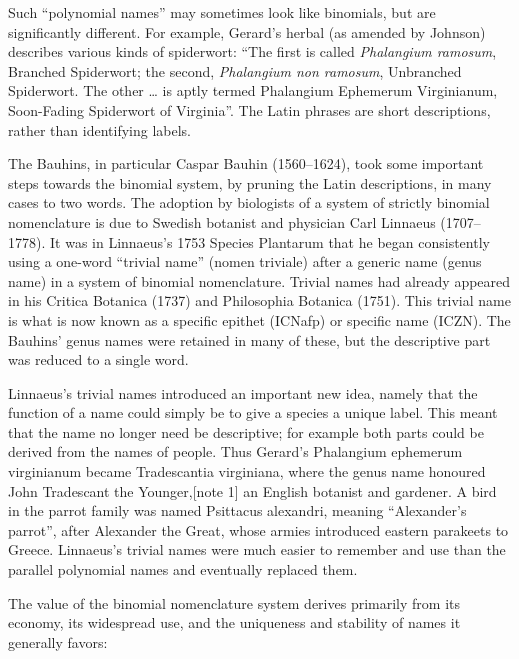 Such ``polynomial names'' may sometimes look like binomials, but are significantly different. For example, Gerard's herbal (as amended by Johnson) describes various kinds of spiderwort: ``The first is called \emph{Phalangium ramosum}, Branched Spiderwort; the second, \emph{Phalangium non ramosum}, Unbranched Spiderwort. The other \ldots{} is aptly termed Phalangium Ephemerum Virginianum, Soon-Fading Spiderwort of Virginia''. The Latin phrases are short descriptions, rather than identifying labels.

The Bauhins, in particular Caspar Bauhin (1560--1624), took some important steps towards the binomial system, by pruning the Latin descriptions, in many cases to two words. The adoption by biologists of a system of strictly binomial nomenclature is due to Swedish botanist and physician Carl Linnaeus (1707--1778). It was in Linnaeus's 1753 Species Plantarum that he began consistently using a one-word ``trivial name'' (nomen triviale) after a generic name (genus name) in a system of binomial nomenclature. Trivial names had already appeared in his Critica Botanica (1737) and Philosophia Botanica (1751). This trivial name is what is now known as a specific epithet (ICNafp) or specific name (ICZN). The Bauhins' genus names were retained in many of these, but the descriptive part was reduced to a single word.

Linnaeus's trivial names introduced an important new idea, namely that the function of a name could simply be to give a species a unique label. This meant that the name no longer need be descriptive; for example both parts could be derived from the names of people. Thus Gerard's Phalangium ephemerum virginianum became Tradescantia virginiana, where the genus name honoured John Tradescant the Younger,{[}note 1{]} an English botanist and gardener. A bird in the parrot family was named Psittacus alexandri, meaning ``Alexander's parrot'', after Alexander the Great, whose armies introduced eastern parakeets to Greece. Linnaeus's trivial names were much easier to remember and use than the parallel polynomial names and eventually replaced them.

The value of the binomial nomenclature system derives primarily from its economy, its widespread use, and the uniqueness and stability of names it generally favors:

